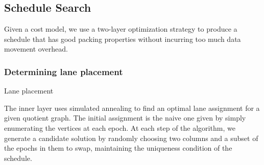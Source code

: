 \subsection{Schedule Search}\label{sec:schedule-search}
Given a cost model, we use a two-layer optimization strategy to produce a schedule that has good packing properties without incurring too much data movement overhead.
\subsubsection*{Determining lane placement}
\begin{algorithm}[t]
    

    \caption{Lane placement}\label{alg:lane-placement}
    
\end{algorithm}
The inner layer uses simulated annealing to find an optimal lane assignment for a given quotient graph.
The initial assignment is the naive one given by simply enumerating the vertices at each epoch.
At each step of the algorithm, we generate a candidate solution by randomly choosing two columns and a subset of the epochs in them to swap, maintaining the uniqueness condition of the schedule.
